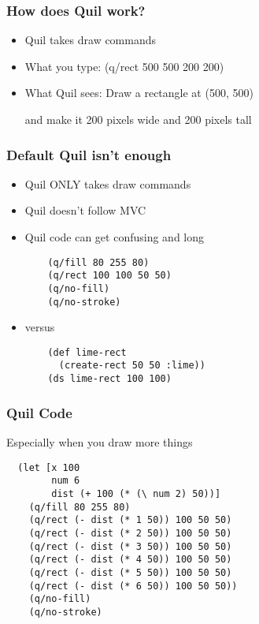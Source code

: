\documentclass{beamer}
\begin{document}
\begin{frame}
	\frametitle{How does Quil work?}
	\begin{itemize}
  		\item Quil takes draw commands
  	 	\item What you type: (q/rect 500 500 200 200)
  	 	\item What Quil sees: Draw a rectangle at (500, 500)\par 
  	 	and make it 200 pixels wide and 200 pixels tall
	 \end{itemize}
\end{frame}

\begin{frame}[fragile]
\frametitle{Default Quil isn't enough}
	\begin{itemize}
		\item Quil ONLY takes draw commands
		\item Quil doesn't follow MVC
		\item Quil code can get confusing and long
		
			\begin{verbatim}
	(q/fill 80 255 80)
	(q/rect 100 100 50 50)
	(q/no-fill)
	(q/no-stroke)
			\end{verbatim}	
		\item versus
		\begin{verbatim}
	(def lime-rect 
	  (create-rect 50 50 :lime))
	(ds lime-rect 100 100)
			\end{verbatim}
	\end{itemize}
\end{frame}


\begin{frame}[fragile]
\frametitle{Quil Code}
	\item Especially when you draw more things
	\begin{itemize}
			\begin{verbatim}
  (let [x 100
  		num 6
  		dist (+ 100 (* (\ num 2) 50))]
	(q/fill 80 255 80)
	(q/rect (- dist (* 1 50)) 100 50 50)
	(q/rect (- dist (* 2 50)) 100 50 50)
	(q/rect (- dist (* 3 50)) 100 50 50)
	(q/rect (- dist (* 4 50)) 100 50 50)
	(q/rect (- dist (* 5 50)) 100 50 50)
	(q/rect (- dist (* 6 50)) 100 50 50))
	(q/no-fill)
	(q/no-stroke)
			\end{verbatim}	
	\end{itemize}
\end{frame}
\end{document}
